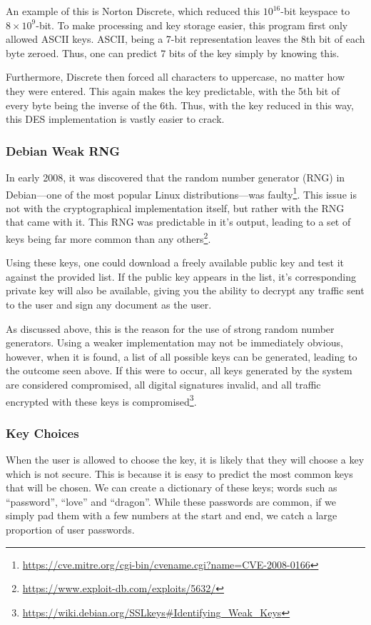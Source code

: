 				An example of this is Norton Discrete, which reduced this $10^{16}$-bit keyspace to $8\times10^9$-bit. 
				To make processing and key storage easier, this program first only allowed ASCII keys. 
				ASCII, being a 7-bit representation leaves the 8th bit of each byte zeroed. 
				Thus, one can predict 7 bits of the key simply by knowing this. 

				Furthermore, Discrete then forced all characters to uppercase, no matter how they were entered. 
				This again makes the key predictable, with the 5th bit of every byte being the inverse of the 6th. 
				Thus, with the key reduced in this way, this DES implementation is vastly easier to crack. 

			\subsubsection{Debian Weak RNG}
				In early 2008, it was discovered that the random number generator (RNG) in Debian---one of the most popular Linux distributions---was faulty\footnote{\url{https://cve.mitre.org/cgi-bin/cvename.cgi?name=CVE-2008-0166}}.
				This issue is not with the cryptographical implementation itself, but rather with the RNG that came with it. 
				This RNG was predictable in it's output, leading to a set of keys being far more common than any others\footnote{\url{https://www.exploit-db.com/exploits/5632/}}.

				Using these keys, one could download a freely available public key and test it against the provided list. 
				If the public key appears in the list, it's corresponding private key will also be available, giving you the ability to decrypt any traffic sent to the user and sign any document as the user. 

				As discussed above, this is the reason for the use of strong random number generators. 
				Using a weaker implementation may not be immediately obvious, 
				however, when it is found, a list of all possible keys can be generated, leading to the outcome seen above. 
				If this were to occur, all keys generated by the system are considered compromised, all digital signatures invalid, and all traffic encrypted with these keys is compromised\footnote{\url{https://wiki.debian.org/SSLkeys\#Identifying\_Weak\_Keys}}.
			\subsubsection{Key Choices}
				When the user is allowed to choose the key, it is likely that they will choose a key which is not secure. 
				This is because it is easy to predict the most common keys that will be chosen.
				We can create a dictionary of these keys; words such as ``password'', ``love'' and ``dragon''. 
				While these passwords are common, if we simply pad them with a few numbers at the start and end, we catch a large proportion of user passwords. 

